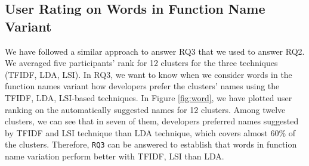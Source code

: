 \subsection{User Rating on Words in Function Name Variant}
We have followed a similar approach to answer RQ3 that we used to answer RQ2. We averaged five participants' rank for 12 clusters for the three techniques (TFIDF, LDA, LSI). In RQ3, we want to know when we consider words in the function names variant how developers prefer the clusters' names using the TFIDF, LDA, LSI-based techniques. In Figure \ref{fig:word}, we have plotted user ranking on the automatically suggested names for 12 clusters. Among twelve clusters, we can see that in seven of them, developers preferred names suggested by TFIDF and LSI technique than LDA technique, which covers almost 60\% of the clusters. Therefore, \texttt{RQ3} can be answered to establish that words in function name variation perform better with TFIDF, LSI than LDA.    
